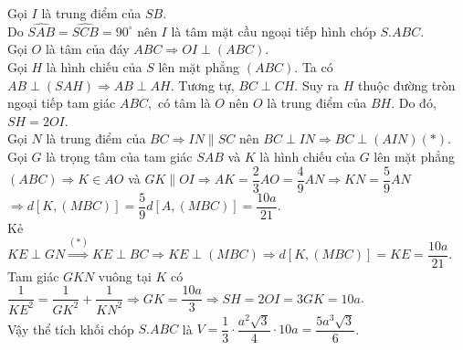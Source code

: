 \begin{ex}
{\begin{center}
		\end{center}
		Gọi $I$ là trung điểm của $SB$.\\
		Do $\widehat{SAB}=\widehat{SCB}=90^{\circ}$ nên $I$ là tâm mặt cầu ngoại tiếp hình chóp $S.ABC$.\\
		Gọi $O$ là tâm của đáy $ABC\Rightarrow OI\perp (ABC)$.\\
		Gọi $H$ là hình chiếu của $S$ lên mặt phẳng $(ABC)$. Ta có $AB\perp (SAH)\Rightarrow AB\perp AH$. Tương tự, $BC\perp CH$. Suy ra $H$ thuộc đường tròn ngoại tiếp tam giác $ABC,$ có tâm là $O$ nên $O$ là trung điểm của $BH$. Do đó, $SH=2OI$.\\
		Gọi $N$ là trung điểm của $BC\Rightarrow IN\parallel SC$ nên $BC\perp IN\Rightarrow BC\perp(AIN)(*)$.\\
		Gọi $G$ là trọng tâm của tam giác $SAB$ và $K$ là hình chiếu của $G$ lên mặt phẳng $(ABC)\Rightarrow K\in AO$ và $GK\parallel OI\Rightarrow AK=\dfrac{2}{3}AO=\dfrac{4}{9}AN\Rightarrow KN=\dfrac{5}{9}AN$ \\
		$\Rightarrow d[K,(MBC)]=\dfrac{5}{9}d[A,(MBC)]=\dfrac{10a}{21}$.\\
		Kẻ $KE\perp GN\overset{(*)}{\Rightarrow} KE\perp BC\Rightarrow KE\perp(MBC)\Rightarrow d[K,(MBC)]=KE=\dfrac{10a}{21}$.\\
		Tam giác $GKN$ vuông tại $K$ có $\dfrac{1}{KE^2}=\dfrac{1}{GK^2}+\dfrac{1}{KN^2}\Rightarrow GK=\dfrac{10a}{3}\Rightarrow SH=2OI=3GK=10a$.\\
		Vậy thể tích khối chóp $S.ABC$ là $V=\dfrac{1}{3}\cdot\dfrac{a^2\sqrt{3}}{4}\cdot 10a=\dfrac{5a^3\sqrt{3}}{6}$.}
\end{ex}
